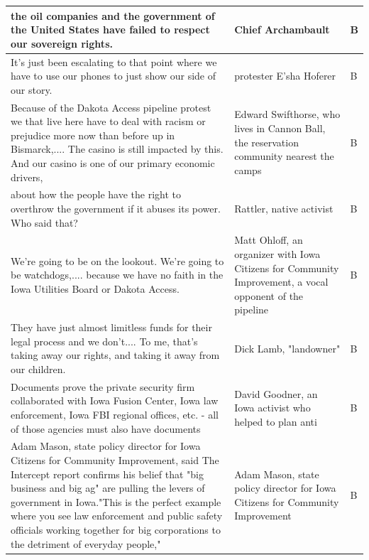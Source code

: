 \begin{footnotesize}
\begin{spacing}{1}
\begin{longtable}{| p{} | P{.25\textwidth} | p{.07\textwidth}|}
the oil companies and the government of the United States have failed to respect our sovereign rights.                                                                & Chief Archambault                            & B              \\ \hline
It's just been escalating to that point where we have to use our phones to just show our side of our story.                                                           & protester E'sha Hoferer                      & B              \\ \hline
Because of the Dakota Access pipeline protest we that live here have to deal with racism or prejudice more now than before up in Bismarck,.... The casino is still impacted by this. And our casino is one of our primary economic drivers,               & Edward Swifthorse, who lives in Cannon Ball, the reservation community nearest the camps                       & B              \\ \hline
about how the people have the right to overthrow the government if it abuses its power. Who said that?                                                                & Rattler, native activist                     & B              \\ \hline
We're going to be on the lookout. We're going to be watchdogs,.... because we have no faith in the Iowa Utilities Board or Dakota Access.                             & Matt Ohloff, an organizer with Iowa Citizens for Community Improvement, a vocal opponent of the pipeline       & B              \\ \hline
They have just almost limitless funds for their legal process and we don't.... To me, that's taking away our rights, and taking it away from our children.            & Dick Lamb, "landowner"                       & B              \\ \hline
Documents prove the private security firm collaborated with Iowa Fusion Center, Iowa law enforcement, Iowa FBI regional offices, etc. - all of those agencies must also have documents                                                                    & David Goodner, an Iowa activist who helped to plan anti                                                        & B              \\ \hline
Adam Mason, state policy director for Iowa Citizens for Community Improvement, said The Intercept report confirms his belief that "big business and big ag" are pulling the levers of government in Iowa."This is the perfect example where you see law enforcement and public safety officials working together for big corporations to the detriment of everyday people,"                                     & Adam Mason, state policy director for Iowa Citizens for Community Improvement                                  & B              \\ \hline

\end{longtable}
\end{spacing}
\end{footnotesize}
